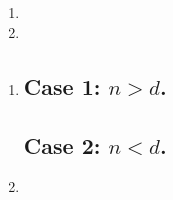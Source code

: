 \section{}
\begin{framed}
\lipsum[1][2]
\begin{enumerate}[label=(\alph*)]
    \item \lipsum[1][2]
    \item \lipsum[1][2]
\end{enumerate}
\end{framed}

\begin{soln}

\begin{enumerate}[label=(\alph*)]
\item \lipsum[1][2]
\subsection*{Case 1: $n>d$.}  
\lipsum[1][2]

\subsection*{Case 2: $n<d$.} 
\lipsum[1][2]

\item \lipsum[1][2]

\begin{claim}
    \lipsum[1][2]
\end{claim}
\begin{proposition}
    \lipsum[1][2]
\end{proposition}
\begin{subproof}
    \lipsum[1][2]
    \begin{proposition}
        \lipsum[1][2]
    \end{proposition}
    \begin{subsubproof}
        \lipsum[1][2]
    \end{subsubproof}
    \lipsum[1][2]
\end{subproof}
\end{enumerate}
\begin{conclusion}
    \lipsum[1][2]
\end{conclusion}
\end{soln}
\begin{remark}
    \lipsum[1][2]
\end{remark}
\begin{extension}
    \lipsum[1][2]
\end{extension}

\section{}
\section{}
\section{}
\section{}
